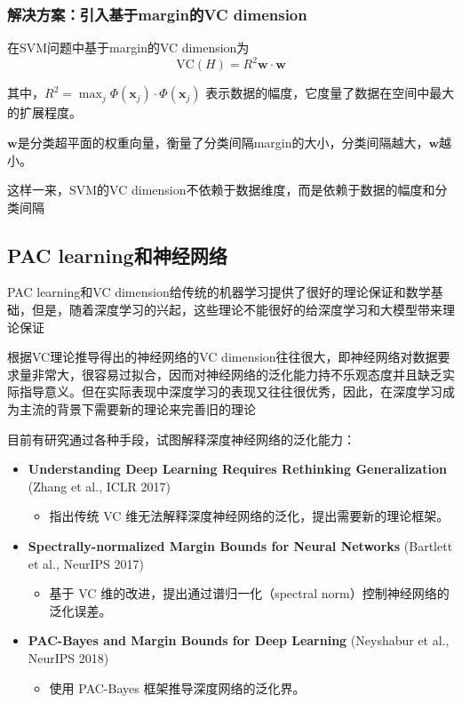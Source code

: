 \documentclass[lang=cn,newtx,10pt,scheme=chinese,chinesefont=nofont,citestyle=gb7714-2015, bibstyle=gb7714-2015]{elegantbook}
\begin{document}
\begin{refsection}
\subsubsection{解决方案：引入基于margin的VC dimension}

在SVM问题中基于margin的VC dimension为
\[ \text{VC}(H) = R^2 \mathbf{w} \cdot \mathbf{w} \]

其中，\( R^2=\max_j \Phi(\mathbf{x}_j) \cdot \Phi(\mathbf{x}_j) \) 表示数据的幅度，它度量了数据在空间中最大的扩展程度。

$\mathbf{w}$是分类超平面的权重向量，衡量了分类间隔margin的大小，分类间隔越大，$\mathbf{w}$越小。

这样一来，SVM的VC dimension不依赖于数据维度，而是依赖于数据的幅度和分类间隔\cite{vapnik1998support}
\subsection{PAC learning和神经网络}
PAC learning和VC dimension给传统的机器学习提供了很好的理论保证和数学基础，但是，随着深度学习的兴起，这些理论不能很好的给深度学习和大模型带来理论保证
    
根据VC理论推导得出的神经网络的VC dimension往往很大，即神经网络对数据要求量非常大，很容易过拟合，因而对神经网络的泛化能力持不乐观态度并且缺乏实际指导意义。但在实际表现中深度学习的表现又往往很优秀，因此，在深度学习成为主流的背景下需要新的理论来完善旧的理论

目前有研究通过各种手段，试图解释深度神经网络的泛化能力：

\begin{itemize}
    \item \textbf{Understanding Deep Learning Requires Rethinking Generalization} (Zhang et al., ICLR 2017)
    \begin{itemize}
        \item 指出传统 VC 维无法解释深度神经网络的泛化，提出需要新的理论框架。
    \end{itemize}
    
    \item \textbf{Spectrally-normalized Margin Bounds for Neural Networks} (Bartlett et al., NeurIPS 2017)
    \begin{itemize}
        \item 基于 VC 维的改进，提出通过谱归一化（spectral norm）控制神经网络的泛化误差。
    \end{itemize}
    
    \item \textbf{PAC-Bayes and Margin Bounds for Deep Learning} (Neyshabur et al., NeurIPS 2018)
    \begin{itemize}
        \item 使用 PAC-Bayes 框架推导深度网络的泛化界。
    \end{itemize}
\end{itemize}


\end{refsection}
\end{document}
